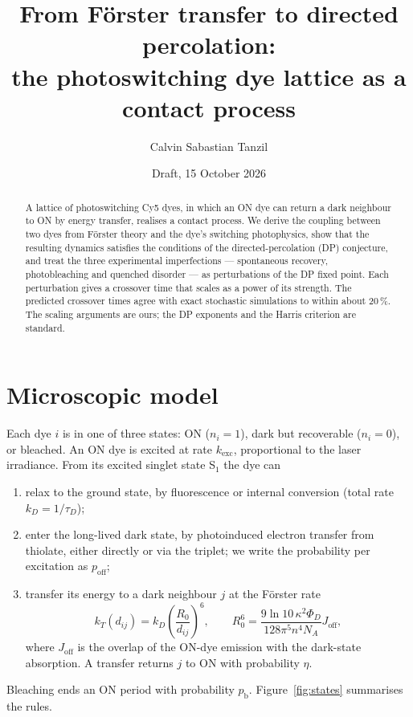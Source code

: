 \documentclass[11pt,a4paper]{article}
\title{From F\"orster transfer to directed percolation:\\
the photoswitching dye lattice as a contact process}
\author{Calvin Sabastian Tanzil}
\date{Draft, 15 October 2026}
\newcommand{\poff}{p_{\mathrm{off}}}
\newcommand{\pb}{p_{\mathrm{b}}}
\begin{document}
\maketitle

\begin{abstract}
A lattice of photoswitching Cy5 dyes, in which an ON dye can return a dark
neighbour to ON by energy transfer, realises a contact process. We derive the
coupling between two dyes from F\"orster theory and the dye's switching
photophysics, show that the resulting dynamics satisfies the conditions of the
directed-percolation (DP) conjecture, and treat the three experimental
imperfections --- spontaneous recovery, photobleaching and quenched disorder ---
as perturbations of the DP fixed point. Each perturbation gives a crossover time
that scales as a power of its strength. The predicted crossover times agree
with exact stochastic simulations to within about 20\,\%. The scaling arguments
are ours; the DP exponents and the Harris criterion are standard.
\end{abstract}

\section{Microscopic model}

Each dye $i$ is in one of three states: ON ($n_i=1$), dark but recoverable
($n_i=0$), or bleached. An ON dye is excited at rate $k_{\mathrm{exc}}$,
proportional to the laser irradiance. From its excited singlet state S$_1$ the
dye can
\begin{enumerate}
  \item relax to the ground state, by fluorescence or internal conversion (total
  rate $k_D=1/\tau_D$);
  \item enter the long-lived dark state, by photoinduced electron transfer from
  thiolate, either directly or via the triplet; we write the probability per
  excitation as $\poff$;
  \item transfer its energy to a dark neighbour $j$ at the F\"orster rate
  \begin{equation}
    k_T(d_{ij}) = k_D\left(\frac{R_0}{d_{ij}}\right)^{6},
    \qquad
    R_0^6 = \frac{9\ln 10\,\kappa^2 \Phi_D}{128\pi^5 n^4 N_A} J_{\mathrm{off}},
    \label{eq:forster}
  \end{equation}
  where $J_{\mathrm{off}}$ is the overlap of the ON-dye emission with the
  dark-state absorption. A transfer returns $j$ to ON with probability $\eta$.
\end{enumerate}
Bleaching ends an ON period with probability $\pb$. Figure~\ref{fig:states}
summarises the rules.
\end{document}
